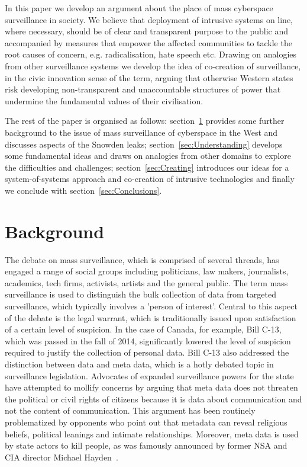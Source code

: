 \documentclass{llncs}
\begin{document}
In this paper we develop an argument about the place of mass cyberspace surveillance in society. We believe that deployment of intrusive systems on line, where necessary, should be of clear and transparent purpose to the public and accompanied by measures that empower the affected communities to tackle the root causes of concern, e.g. radicalisation, hate speech etc. Drawing on analogies from other surveillance systems we develop the idea of co-creation of surveillance, in the civic innovation sense of the term, arguing that otherwise Western states risk developing non-transparent and unaccountable structures of power that undermine the fundamental values of their civilisation.

The rest of the paper is organised as follows: section~\ref{sec:Background} provides some further background to the issue of mass surveillance of cyberspace in the West and discusses aspects of the Snowden leaks; section~\ref{sec:Understanding} develops some fundamental ideas and draws on analogies from other domains to explore the difficulties and challenges; section~\ref{sec:Creating} introduces our ideas for a system-of-systems approach and co-creation of intrusive technologies and finally we conclude with section~\ref{sec:Conclusions}.

\section{Background}
\label{sec:Background}
The debate on mass surveillance, which is comprised of several threads, has engaged a range of social groups including politicians, law makers, journalists, academics, tech firms, activists, artists and the general public. The term mass surveillance is used to distinguish the bulk collection of data from targeted surveillance, which typically involves a 'person of interest'. Central to this aspect of the debate is the legal warrant, which is traditionally issued upon satisfaction of a certain level of suspicion. In the case of Canada, for example, Bill C-13, which was passed in the fall of 2014, significantly lowered the level of suspicion required to justify the collection of personal data. Bill C-13 also addressed the distinction between data and meta data, which is a hotly debated topic in surveillance legislation. Advocates of expanded surveillance powers for the state have attempted to mollify concerns by arguing that meta data does not threaten the political or civil rights of citizens because it is data about communication and not the content of communication. This argument has been routinely problematized by opponents who point out that metadata can reveal religious beliefs, political leanings and intimate relationships. Moreover, meta data is used by state actors to kill people, as was famously announced by former NSA and CIA director Michael Hayden~\cite{Hayden}. 
\end{document}
